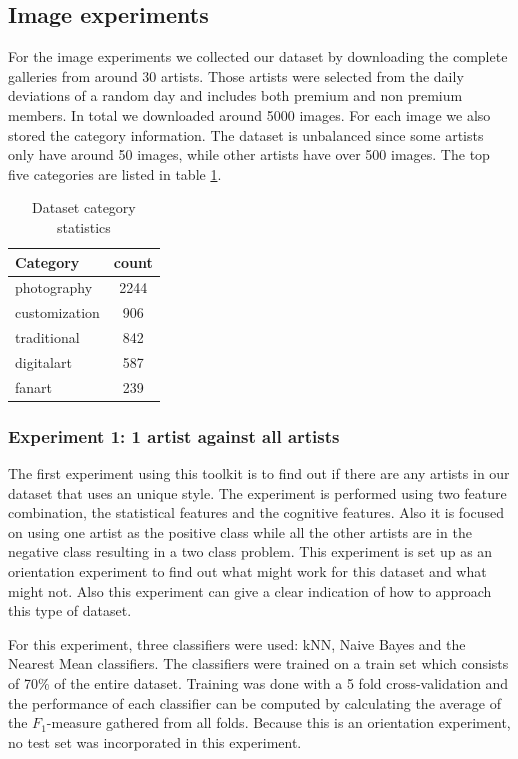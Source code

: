 \subsection{Image experiments}
For the image experiments we collected our dataset by downloading the complete galleries from around 30 artists.
Those artists were selected from the daily deviations of a random day and includes both premium and non premium members.
In total we downloaded around 5000 images. 
For each image we also stored the category information.
The dataset is unbalanced since some artists only have around 50 images, while other artists have over 500 images.
The top five categories are listed in table \ref{datasetstats}.

\begin{table}
    \centering
    \begin{tabular}
        { | l | c | } 
        \hline
        Category & count \\
        \hline
        photography & 2244 \\ 
        customization & 906 \\ 
        traditional & 842 \\ 
        digitalart & 587 \\ 
        fanart & 239 \\ 
        \hline 
    \end{tabular}
    \caption{Dataset category statistics}
    \label{datasetstats}
\end{table}

\subsubsection{Experiment 1: 1 artist against all artists}
The first experiment using this toolkit is to find out if there are any artists in our dataset that uses an unique style.
The experiment is performed using two feature combination, the statistical features and the cognitive features.
Also it is focused on using one artist as the positive class while all the other artists are in the negative class resulting in a two class problem.
This experiment is set up as an orientation experiment to find out what might work for this dataset and what might not.
Also this experiment can give a clear indication of how to approach this type of dataset.

For this experiment, three classifiers were used: kNN, Naive Bayes and the Nearest Mean classifiers.
The classifiers were trained on a train set which consists of 70\% of the entire dataset.
Training was done with a 5 fold cross-validation and the performance of each classifier can be computed by calculating the average of the $F_1$-measure gathered from all folds.
Because this is an orientation experiment, no test set was incorporated in this experiment.


